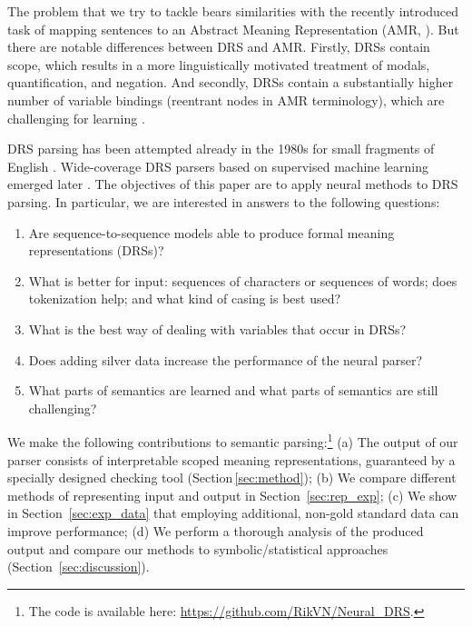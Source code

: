 \documentclass[11pt,a4paper]{article}
\begin{document}
The problem that we try to tackle bears similarities with the recently introduced task of mapping sentences to an Abstract Meaning Representation (AMR, \citealt{amr:13}). But there are notable differences between DRS and AMR.  
Firstly, DRSs contain scope, which results in a more linguistically motivated treatment of modals, quantification, and negation.
And secondly, DRSs contain a substantially higher number of variable bindings (reentrant nodes in AMR terminology), which are challenging for learning \cite{damonte:17}.

DRS parsing has been attempted already in the 1980s for small fragments of English \cite{johnsonklein,wadaasher}. Wide-coverage DRS parsers based on supervised machine learning emerged later \cite{step2008:boxer,le:12,boxer,neural_drs_gmb:18}. 
The objectives of this paper are to apply neural methods to DRS parsing. In particular, we are interested in answers to the following questions:

\begin{enumerate}[itemsep=-1.5mm, topsep=2mm]
    \item Are sequence-to-sequence models able to produce formal meaning representations (DRSs)?
    \item What is better for input: sequences of characters or sequences of words; does tokenization help; and what kind of casing is best used?
    \item What is the best way of dealing with variables that occur in DRSs?
    \item Does adding silver data increase the performance of the neural parser?
    \item What parts of semantics are learned and what parts of semantics are still challenging?
\end{enumerate}

\noindent
We make the following contributions to semantic parsing:\footnote{The code is available here: \url{https://github.com/RikVN/Neural_DRS}.} 
(a) The output of our parser consists of interpretable scoped meaning representations, guaranteed by a specially designed checking tool (Section\,\ref{sec:method});
(b) We compare different methods of representing input and output in Section~\ref{sec:rep_exp};
(c) We show in Section~\ref{sec:exp_data} that employing additional, non-gold standard data can improve performance;
(d) We perform a thorough analysis of the produced output and compare our methods to symbolic/statistical approaches (Section~\ref{sec:discussion}).  
\end{document}
